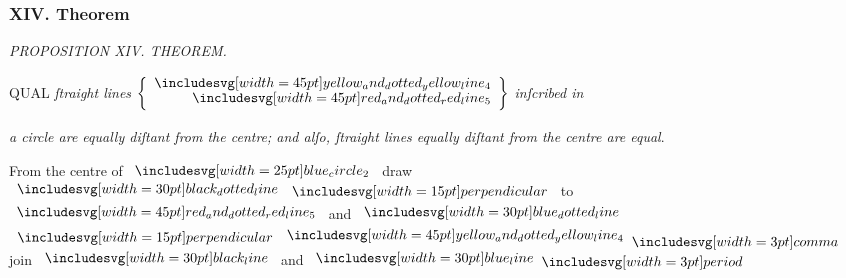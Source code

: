 \documentclass[11pt,preview]{standalone}
\begin{document}
\subsubsection{XIV. Theorem}

\begin{minipage}[t]{0.43\textwidth}
    \vspace{20pt}
    
\end{minipage}%
\hfill
\begin{minipage}[t]{0.54\textwidth}
    \begin{center}
        \textit{PROPOSITION XIV. THEOREM.}\label{book3pr14} \\
    \end{center}

    \hfill

    \begin{center}
        \raggedright \lettrine[lines=3, loversize=1, nindent=0pt]{}{}QUAL \textit{ſtraight lines} $\left\{\begin{aligned} \bimg{yellow_and_dotted_yellow_line_4} \\[-2ex] \bimg{red_and_dotted_red_line_5} \end{aligned}\right\}$ \textit{inſcribed in}
    \end{center}
    \textit{a circle are equally diſtant from the centre; and alſo, ſtraight lines equally diſtant from the centre are equal}.
\end{minipage}%

\hfill

\begin{center}
    From the centre of $\img{blue_circle_2}$ draw\\
    $\dottedblackline \bperp$ to $\bimg{red_and_dotted_red_line_5}$ and $\dottedblueline$\\
    $\bperp \bimg{yellow_and_dotted_yellow_line_4} \bcomma$ join $\blackline$ and $\blueline \bperiod$
\end{center}

\hfill
\end{document}
